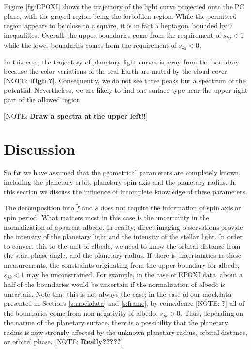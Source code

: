 \documentclass[iop,numberedappendix,apj,]{emulateapj}
\def\fast{\tilde f}
\def\memoYF#1{\color{red}[NOTE: {\bf #1}]\color{black}}
\begin{document}
Figure \ref{fig:EPOXI} shows the trajectory of the light curve projected onto the PC plane, with the grayed region being the forbidden region. 
While the permitted region appears to be close to a square, it is in fact a heptagon, bounded by 7 inequalities. Overall, the upper boundaries come from the requirement of $s_{kj}<1$ while the lower boundaries comes from the requirement of $s_{kj}<0$. 

In this case, the trajectory of planetary light curves is away from the boundary because the color variations of the real Earth are muted by the cloud cover \memoYF{Right?}. 
Consequently, we do not see three peaks but a spectrum of the potential. 
Nevertheless, we are likely to find one surface type near the upper right part of the allowed region. 


\memoYF{Draw a spectra at the upper left!!}




\section{Discussion}
\label{s:discussion}

So far we have assumed that the geometrical parameters are completely known, including the planetary orbit, planetary spin axis and the planetary radius. 
In this section we discuss the influence of incomplete knowledge of these parameters. 

The decomposition into $\fast $ and $s$ does not require the information of spin axis or spin period. 
What matters most in this case is the uncertainty in the normalization of apparent albedo. 
In reality, direct imaging observations provide the intensity of the 
planetary light and the intensity of the stellar light. 
In order to convert this to the unit of albedo, we need to know the orbital distance from the star, phase angle, and the planetary radius. 
If there is uncertainties in these measurements, the constraints originating from the upper boundary for albedo, $s_{jk} < 1$ may be unconstrained. 
For example, in the case of EPOXI data, about a half of the boundaries would be uncertain if the normalization of albedo is uncertain. 
Note that this is not always the case; in the case of our mockdata presented in Sections \ref{s:mockdata} and \ref{s:frame}, by coincidence \memoYF{?} all of the boundaries come from non-negativity of albedo, $s_{jk} > 0$. 
Thus, depending on the nature of the planetary surface, there is a possibility that the planetary radius is now strongly affected by the unknown planetary radius, orbital distance, or orbital phase. \memoYF{Really?????}
\end{document}
